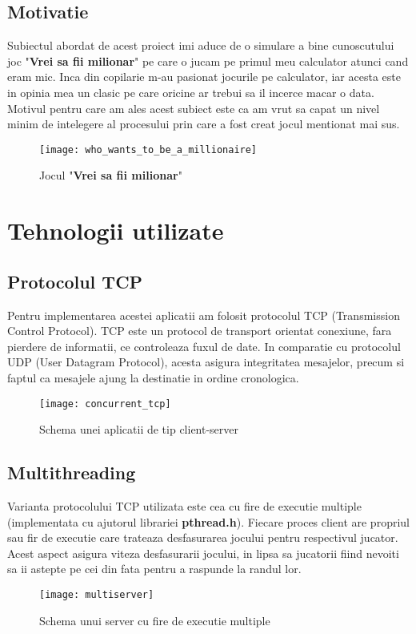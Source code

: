 \documentclass[runningheads]{llncs}
\begin{document}
\subsection{Motivatie}
Subiectul abordat de acest proiect imi aduce de o simulare a bine cunoscutului joc "\textbf{Vrei sa fii milionar}" pe care o jucam pe primul meu calculator atunci cand eram mic.
Inca din copilarie m-au pasionat jocurile pe calculator, iar acesta este in opinia mea un clasic pe care oricine ar trebui sa il incerce macar o data.
Motivul pentru care am ales acest subiect este ca am vrut sa capat un nivel minim de intelegere al procesului prin care a fost creat jocul mentionat mai sus.

\begin{figure}[H]
\centering
\texttt{[image: who\_wants\_to\_be\_a\_millionaire]}
\caption{Jocul "\textbf{Vrei sa fii milionar}"}
\end{figure}
\newpage

\section{Tehnologii utilizate}
\subsection{Protocolul TCP}
Pentru implementarea acestei aplicatii am folosit protocolul TCP (Transmission Control Protocol).
TCP este un protocol de transport orientat conexiune, fara pierdere de informatii, ce controleaza fuxul de date.
In comparatie cu protocolul UDP (User Datagram Protocol), acesta asigura integritatea mesajelor, precum si faptul ca mesajele ajung la destinatie in ordine cronologica.
\begin{figure}[H]
\centering
\texttt{[image: concurrent\_tcp]}
\caption{Schema unei aplicatii de tip client-server}
\end{figure}

\subsection{Multithreading}
Varianta protocolului TCP utilizata este cea cu fire de executie multiple (implementata cu ajutorul librariei \textbf{pthread.h}).
Fiecare proces client are propriul sau fir de executie care trateaza desfasurarea jocului pentru respectivul jucator.
Acest aspect asigura viteza desfasurarii jocului, in lipsa sa jucatorii fiind nevoiti sa ii astepte pe cei din fata pentru a raspunde la randul lor.
\begin{figure}[H]
\centering
\texttt{[image: multiserver]}
\caption{Schema unui server cu fire de executie multiple}
\end{figure}
\end{document}
